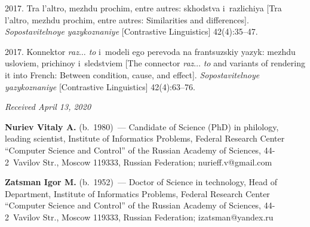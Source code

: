 \begin{multicols}{2}
{{\begin{thebibliography}{99}
 2017. Tra l'altro, mezhdu prochim, entre autres: skhodstva i~razlichiya [Tra 
l'altro, mezhdu prochim, entre autres: Similarities and differences]. \textit{Sopostavitelnoye yazykoznaniye} 
[Contrastive Linguistics] 42(4):35--47.

 2017. Konnektor \textit{raz$\ldots$ to} i~modeli ego perevoda na frantsuzskiy yazyk: 
mezhdu usloviem, prichinoy i~sledstviem [The connector \textit{raz}$\ldots$ \textit{to} and variants of 
rendering it into French: Between condition, cause, and effect]. \textit{Sopostavitelnoye yazykoznaniye} 
[Contrastive Linguistics] 42(4):63--76.

\end{thebibliography}

 }
 }

\end{multicols}

\vspace*{-14pt}

\hfill{\small\textit{Received April 13, 2020}}

\pagebreak



\Contr

\noindent
\textbf{Nuriev Vitaly A.} (b.\ 1980)~--- Candidate of Science (PhD) in philology, leading scientist, Institute of
Informatics Problems, Federal Research Center ``Computer Science and Control'' of the Russian Academy
of Sciences, 44-2~Vavilov Str., Moscow 119333, Russian Federation; \mbox{nurieff.v@gmail.com}

\vspace*{6pt}

\noindent
\textbf{Zatsman Igor M.} (b.\ 1952)~--- Doctor of Science in technology, Head of Department, Institute of 
Informatics
Problems, Federal Research Center ``Computer Science and Control'' of the Russian Academy of Sciences,
44-2~Vavilov Str., Moscow 119333, Russian Federation; \mbox{izatsman@yandex.ru}
\label{end\stat}

\renewcommand{\bibname}{\protect\rm Литература} 